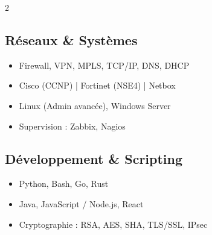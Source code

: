 \begin{multicols}{2}
\subsection*{Réseaux \& Systèmes}
\begin{itemize}
  \item Firewall, VPN, MPLS, TCP/IP, DNS, DHCP
  \item Cisco (CCNP) | Fortinet (NSE4) | Netbox
  \item Linux (Admin avancée), Windows Server
  \item Supervision : Zabbix, Nagios
\end{itemize}

\subsection*{Développement \& Scripting}
\begin{itemize}
  \item Python, Bash, Go, Rust
  \item Java, JavaScript / Node.js, React
  \item Cryptographie : RSA, AES, SHA, TLS/SSL, IPsec
\end{itemize}

\end{multicols}
